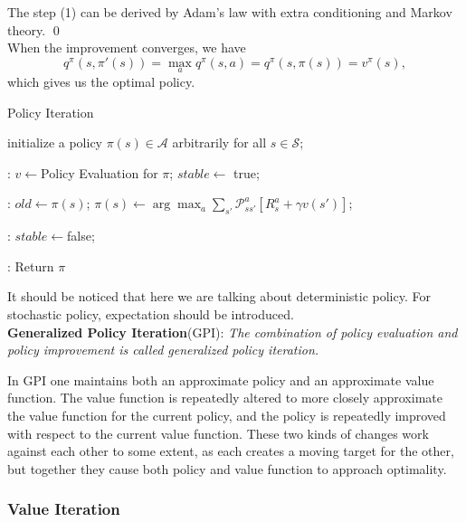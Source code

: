 \documentclass{progartcn}
\begin{document}
		The step (1) can be derived by Adam's law with extra conditioning and Markov theory.
		\qed\\

		When the improvement converges, we have
		\[q^\pi(s,\pi'(s))=\max_{a} q^\pi(s,a)=q^\pi(s,\pi(s))=v^\pi(s),\]
		which gives us the optimal policy.\\

		\begin{algorithm}[H]
		\caption{Policy Iteration}
		\label{alg: Policy Iteration}
		\begin{algorithmic}[1]
        \State initialize a policy $\pi(s)\in\mathcal{A}$ arbitrarily for all $s\in\mathcal{S}$;

        :
			\State $v\gets$Policy Evaluation for $\pi$;
        	\State $stable\gets$ true;

        	:
        		\State $old\gets \pi(s)$;
        		\State $\pi(s)\gets\arg\max_{a}\sum_{s'}\mathcal{P}_{ss'}^a[R_s^a+\gamma v(s')]$;
        		
        		:
            		\State $stable\gets$false;
            	\EndIf
            \EndFor


            :
            	\State Return $\pi$\;
            \EndIf
        \EndFor
        \end{algorithmic}
        \end{algorithm}

        It should be noticed that here we are talking about deterministic policy. For stochastic policy, expectation should be introduced.\\

		\textbf{Generalized Policy Iteration}(GPI): \textit{The combination of policy evaluation and policy improvement is called generalized policy iteration.}

		In GPI one maintains both an approximate policy and an approximate value function. The value function is repeatedly altered to more closely approximate the value function for the current policy, and the policy is repeatedly improved with respect to the current value function. These two kinds of changes work against each other to some extent, as each creates a moving target for the other, but together they cause both policy and value function to approach optimality.\\


	\subsubsection{Value Iteration}
\end{document}

